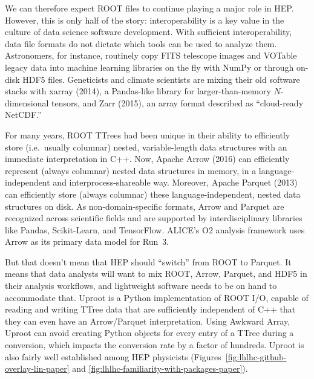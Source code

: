 \documentclass{article}
\begin{document}
We can therefore expect ROOT files to continue playing a major role in HEP. However, this is only half of the story: interoperability is a key value in the culture of data science software development. With sufficient interoperability, data file formats do not dictate which tools can be used to analyze them. Astronomers, for instance, routinely copy FITS telescope images and VOTable legacy data into machine learning libraries on the fly with NumPy or through on-disk HDF5 files. Geneticists and climate scientists are mixing their old software stacks with xarray (2014), a Pandas-like library for larger-than-memory $N$-dimensional tensors, and Zarr (2015), an array format described as ``cloud-ready NetCDF.''

For many years, ROOT TTrees had been unique in their ability to efficiently store (i.e.\ usually columnar) nested, variable-length data structures with an immediate interpretation in C++. Now, Apache Arrow (2016) can efficiently represent (always columnar) nested data structures in memory, in a language-independent and interprocess-shareable way. Moreover, Apache Parquet (2013) can efficiently store (always columnar) these language-independent, nested data structures on disk. As non-domain-specific formats, Arrow and Parquet are recognized across scientific fields and are supported by interdisciplinary libraries like Pandas, Scikit-Learn, and TensorFlow. ALICE's O2 analysis framework uses Arrow as its primary data model for Run~3.

But that doesn't mean that HEP should ``switch'' from ROOT to Parquet. It means that data analysts will want to mix ROOT, Arrow, Parquet, and HDF5 in their analysis workflows, and lightweight software needs to be on hand to accommodate that. Uproot is a Python implementation of ROOT I/O, capable of reading and writing TTree data that are sufficiently independent of C++ that they can even have an Arrow/Parquet interpretation. Using Awkward Array, Uproot can avoid creating Python objects for every entry of a TTree during a conversion, which impacts the conversion rate by a factor of hundreds. Uproot is also fairly well established among HEP physicists (Figures~\ref{fig:lhlhc-github-overlay-lin-paper} and \ref{fig:lhlhc-familiarity-with-packages-paper}).
\end{document}
